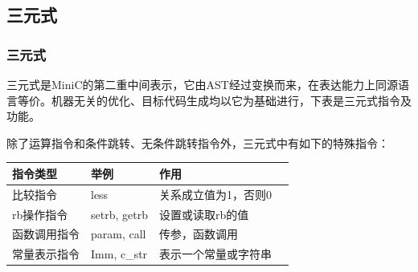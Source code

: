 \documentclass{beamer}
\begin{document}
\subsection{三元式}
\begin{frame}
	\frametitle{三元式}
	\noindent
	三元式是MiniC的第二重中间表示，它由AST经过变换而来，在表达能力上同源语言等价。机器无关的优化、目标代码生成均以它为基础进行，下表是三元式指令及功能。

除了运算指令和条件跳转、无条件跳转指令外，三元式中有如下的特殊指令：
\begin{center}
	\begin{tabular}{|l|l|l|l|}
	\hline
		指令类型 & 举例 & 作用 \\
		\hline
		比较指令 & less  & 关系成立值为1，否则0 \\
		\hline
		rb操作指令 & setrb, getrb & 设置或读取rb的值 \\
		\hline
		函数调用指令 & param, call& 传参，函数调用\\
		\hline
		常量表示指令 & Imm, c\_str & 表示一个常量或字符串\\
	\hline
	\end{tabular}
\end{center}
\end{frame}
\end{document}
